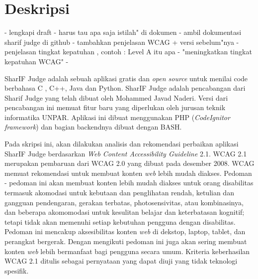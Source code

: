 \documentclass[a4paper,twoside]{article}
\begin{document}
\title{\@judultopik}
\author{\nama \textendash \@npm} 

\newcommand{\nama}{Amabel Levint}
\newcommand{\@npm}{2016730013}
\newcommand{\@judultopik}{Kepatuhan dan Rekomendasi Perbaikan Web Content Accessibility Guideline 2.1 untuk Aplikasi SharIF Judge} %
\newcommand{\jumpemb}{1} %
\newcommand{\tanggal}{01/01/1900}


\maketitle


\section{Deskripsi}
- lengkapi draft
- harus tau apa saja istilah" di dokumen
- ambil dokumentasi sharif judge di github
- tambahkan penjelasan WCAG + versi sebelum"nya
- penjelasan tingkat kepatuhan , contoh : Level A itu apa
- "meningkatkan tingkat kepatuhan WCAG"
- 

SharIF Judge adalah sebuah aplikasi gratis dan \textit{open source} untuk menilai code berbahasa C , C++, Java dan Python. SharIF Judge adalah pencabangan dari Sharif Judge yang telah dibuat oleh Mohammed Javad Naderi. Versi dari pencabangan ini memuat fitur baru yang diperlukan oleh jurusan teknik informatika UNPAR. Aplikasi ini dibuat menggunakan PHP (\textit{CodeIgnitor framework}) dan bagian backendnya dibuat dengan BASH.

Pada skripsi ini, akan dilakukan analisis dan rekomendasi perbaikan aplikasi SharIF Judge berdasarkan \textit{Web Content Accessibility Guideline} 2.1. WCAG 2.1 merupakan pembaruan dari WCAG 2.0 yang dibuat pada desember 2008. WCAG memuat rekomendasi untuk membuat konten \textit{web} lebih mudah diakses. Pedoman - pedoman ini akan membuat konten lebih mudah diakses untuk orang disabilitas termasuk akomodasi untuk kebutaan dan penglihatan rendah, ketulian dan gangguan pendengaran, gerakan terbatas, photosensivitas, atau kombinasinya, dan beberapa akomomodasi untuk kesulitan belajar dan keterbatasan kognitif; tetapi tidak akan memenuhi setiap kebutuhan pengguna dengan disabilitas. Pedoman ini mencakup aksesibilitas konten \textit{web} di dekstop, laptop, tablet, dan perangkat bergerak. Dengan mengikuti pedoman ini juga akan sering membuat konten \textit{web} lebih bermanfaat bagi pengguna secara umum. Kriteria keberhasilan WCAG 2.1 ditulis sebagai pernyataan yang dapat diuji yang tidak teknologi spesifik.
\end{document}
